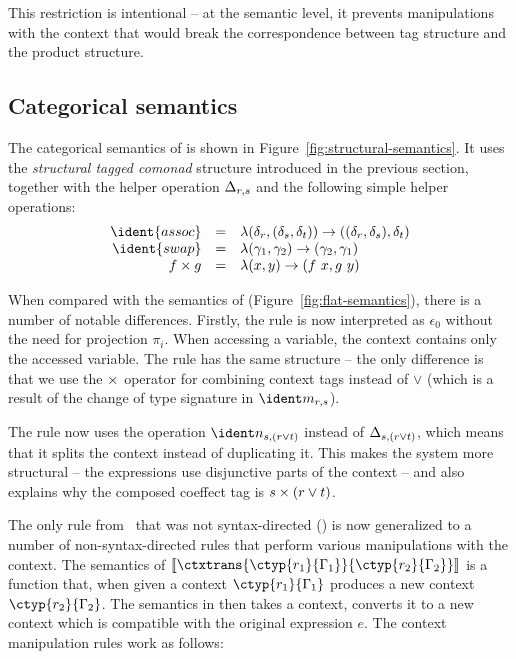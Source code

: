 This restriction is intentional -- at the semantic level, it prevents manipulations
with the context that would break the correspondence between tag structure and the
product structure.

\subsection{Categorical semantics}
The categorical semantics of \clstr is shown in Figure~\ref{fig:structural-semantics}.
It uses the \emph{structural tagged comonad} structure introduced in the previous section,
together with the helper operation $\Delta_{r, s}$ and the following simple helper 
operations:
\begin{equation*}
\begin{array}{rcl}
\ident{assoc} &=& \lambda (\delta_r, (\delta_s, \delta_t)) \rightarrow ((\delta_r, \delta_s), \delta_t)\\
\ident{swap}  &=& \lambda (\gamma_1, \gamma_2) \rightarrow (\gamma_2, \gamma_1)\\
f \times g &=& \lambda (x, y) \rightarrow (f~x, g~y)
\end{array}
\end{equation*}

When compared with the semantics of \clflt (Figure~\ref{fig:flat-semantics}), there is a number of 
notable differences. Firstly, the rule  is now interpreted as $\epsilon_0$ without 
the need for projection $\pi_i$. When accessing a variable, the context contains only the accessed
variable. The  rule has the same structure -- the only difference is that we use the
$\times$ operator for combining context tags instead of $\vee$ (which is a result of the change of
type signature in $\cmerge_{r, s}$).

The rule  now uses the operation $\csplit_{s, (r \csvop t)}$ instead of $\Delta_{s, (r \vee t)}$,
which means that it splits the context instead of duplicating it. This makes the system more 
structural -- the expressions use disjunctive parts of the context -- and also explains why the
composed coeffect tag is $s \times (r \vee t)$.

The only rule from \clflt~that was not syntax-directed () is now generalized to a number
of non-syntax-directed rules  that perform various manipulations with the context. The semantics
of $\cosem{ \ctxtrans{\ctyp{r_1}{\Gamma_1}}{\ctyp{r_2}{\Gamma_2}} }$ is a function that, when given a context
$\ctyp{r_1}{\Gamma_1}$ produces a new context $\ctyp{r_2}{\Gamma_2}$. The semantics in  then 
takes a context, converts it to a new context which is compatible with the original expression $e$.
The context manipulation rules work as follows:

